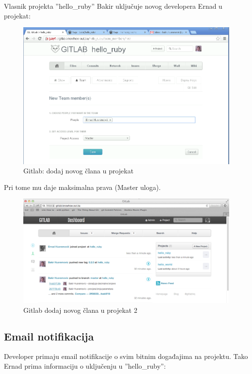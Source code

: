 \documentclass[times, utf8, seminar]{fit}
\begin{document}
Vlasnik projekta ''hello\_ruby'' Bakir uključuje novog developera Ernad u projekat:

\begin{figure}[H]
\centering
\includegraphics[width=15cm]{img/gitlab_add_new_member_to_project.png}
\caption{Gitlab: dodaj novog člana u projekat}
\end{figure}

Pri tome mu daje maksimalna prava (Master uloga).

\begin{figure}[H]
\centering
\includegraphics[width=15cm]{img/gitlab_add_new_member_to_project_2.png}
\caption{Gitlab dodaj novog člana u projekat 2}
\end{figure}

\subsection{Email notifikacija}

Developer primaju email notifikacije o svim bitnim događajima na projektu. Tako Ernad prima informaciju o uključenju u ''hello\_ruby'':
\end{document}
